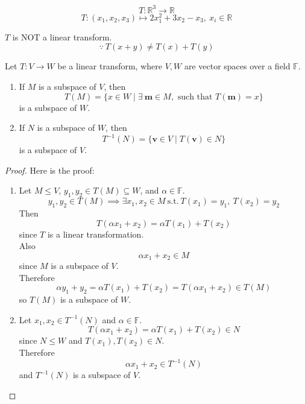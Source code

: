 \begin{eg}
    \[
        T: \mathbb{R}^3 \to \mathbb{R}
    \]
    \[
        T: (x_1, x_2, x_3) \mapsto 2x_1^2 + 3x_2 - x_3, \ x_i \in \mathbb{R}
    \]
\end{eg}
$T$ is NOT a linear transform.
\[
    \because \ T(x+y) \neq T(x) + T(y)
\]

\begin{theorem}
    Let $T: V \to W$ be a linear transform, where $V, W$ are vector spaces over a field $\mathbb{F}$.
    \begin{enumerate}[label=(\roman*)]
        \item If $M$ is a subspace of $V$, then
        \[
            T(M) = \{x \in W \mid \exists\ \mathbf{m} \in M, \text{ such that } T(\mathbf{m}) = x\}
        \]
        is a subspace of $W$.
        \item If $N$ is a subspace of $W$, then
        \[
            T^{-1}(N) = \{\mathbf{v} \in V \mid T(\mathbf{v}) \in N\}
        \]
        is a subspace of $V$.
    \end{enumerate}
\end{theorem}
\begin{proof}
    Here is the proof:
    \begin{enumerate}[label=(\roman*)]
        \item Let $M \leq V$, $y_1, y_2 \in T(M) \subseteq W$, and $\alpha \in \mathbb{F}$.
        \[
            y_1, y_2 \in T(M) \implies \exists x_1, x_2 \in M \ \text{s.t.}\ T(x_1) = y_1,\ T(x_2) = y_2
        \]
        Then
        \[
            T(\alpha x_1 + x_2) = \alpha T(x_1) + T(x_2)
        \]
        since $T$ is a linear transformation. \\
        Also
        \[
            \alpha x_1 + x_2 \in M
        \]
        since $M$ is a subspace of $V$. \\
        Therefore
        \[
            \alpha y_1 + y_2 = \alpha T(x_1) + T(x_2) = T(\alpha x_1 + x_2) \in T(M)
        \]
        so $T(M)$ is a subspace of $W$.

        \item Let $x_1, x_2 \in T^{-1}(N)$ and $\alpha \in \mathbb{F}$.
        \[
            T(\alpha x_1 + x_2) = \alpha T(x_1) + T(x_2) \in N
        \]
        since $N \leq W$ and $T(x_1), T(x_2) \in N$. \\
        Therefore
        \[
            \alpha x_1 + x_2 \in T^{-1}(N)
        \]
        and $T^{-1}(N)$ is a subspace of $V$.
    \end{enumerate}
\end{proof}


